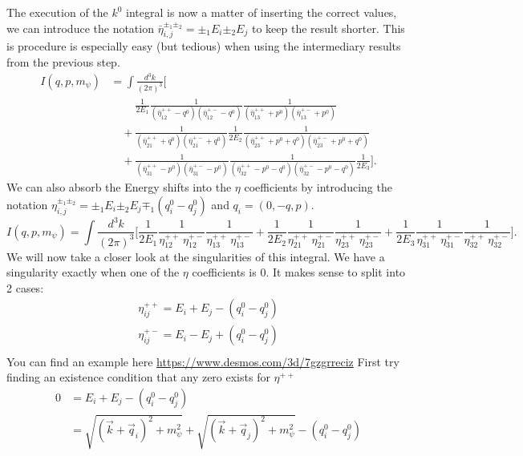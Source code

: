 The execution of the $k^0$ integral is now a matter of inserting the correct values, we can introduce the notation $\bar{\eta}^{\pm_1\pm_2}_{i,j} =\pm_1E_i \pm_2E_j$ to keep the result shorter. This is procedure is especially easy (but tedious) when using the intermediary results from the previous step.
\begin{align*}
    I(q,p,m_\psi)
    &= \int\frac{d^3k}{(2\pi)^3}
    \Bigg[\\
    &\quad \phantom{+} \frac{1}{2E_1}
    \frac{1}{(\bar{\eta}^{++}_{12} - q^0)(\bar{\eta}^{+-}_{12} - q^0)}
    \frac{1}{(\bar{\eta}^{++}_{13} + p^0)(\bar{\eta}^{+-}_{13} + p^0)} \\
    &\quad +
    \frac{1}{(\bar{\eta}^{++}_{21} + q^0)(\bar{\eta}^{+-}_{21} + q^0)}
    \frac{1}{2E_2}
    \frac{1}{(\bar{\eta}^{++}_{23} + p^0 + q^0)(\bar{\eta}^{+-}_{23} + p^0 + q^0)} \\
    &\quad +
    \frac{1}{(\bar{\eta}^{++}_{31} - p^0)(\bar{\eta}^{+-}_{31} - p^0)}
    \frac{1}{(\bar{\eta}^{++}_{32} - p^0 - q^0)(\bar{\eta}^{+-}_{32} - p^0 - q^0)}
    \frac{1}{2E_3}
    \Bigg].
\end{align*}
We can also absorb the Energy shifts into the $\eta$ coefficients by introducing the notation $\eta^{\pm_1\pm_2}_{i,j} =\pm_1E_i \pm_2E_j \mp_1 (q^0_i-q^0_j)$ and $q_i = (0,-q, p)$.
\begin{equation}
    I(q,p,m_\psi)
    = \int\frac{d^3k}{(2\pi)^3}
    \Bigg[
    \frac{1}{2E_1}
    \frac{1}{\eta^{++}_{12}\,\eta^{+-}_{12}}
    \frac{1}{\eta^{++}_{13}\,\eta^{+-}_{13}}
     +
    \frac{1}{2E_2}
    \frac{1}{\eta^{++}_{21}\,\eta^{+-}_{21}}
    \frac{1}{\eta^{++}_{23}\,\eta^{+-}_{23}}
     +
    \frac{1}{2E_3}
    \frac{1}{\eta^{++}_{31}\,\eta^{+-}_{31}}
    \frac{1}{\eta^{++}_{32}\,\eta^{+-}_{32}}
    \Bigg]. \label{eq:ltd}
\end{equation}
We will now take a closer look at the singularities of this integral. We have a singularity exactly when one of the $\eta$ coefficients is $0$. It makes sense to split into 2 cases:
\begin{align}
    \eta^{++}_{ij} = E_i + E_j - (q^0_i - q^0_j)\\
    \eta^{+-}_{ij} = E_i - E_j + (q^0_i - q^0_j)\\
\end{align}
You can find an example here \url{https://www.desmos.com/3d/7gzgrreciz}
First try finding an existence condition that any zero exists for $\eta^{++}$
\begin{align}
    0 &= E_i + E_j - (q^0_i - q^0_j)\\
    &= \sqrt{(\vec{k}+\vec{q}_i)^2+m_\psi^2} + \sqrt{(\vec{k}+\vec{q}_j)^2+m_\psi^2} - (q^0_i - q^0_j)\\
\end{align}
